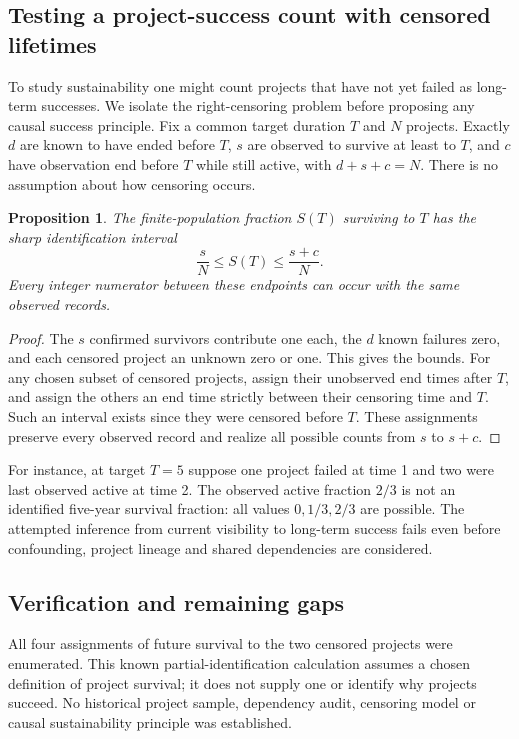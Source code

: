 \documentclass[11pt]{article}
\newtheorem{proposition}{Proposition}
\begin{document}
\subsection{Testing a project-success count with censored lifetimes}
To study sustainability one might count projects that have not yet failed as long-term successes. We isolate the right-censoring problem before proposing any causal success principle. Fix a common target duration $T$ and $N$ projects. Exactly $d$ are known to have ended before $T$, $s$ are observed to survive at least to $T$, and $c$ have observation end before $T$ while still active, with $d+s+c=N$. There is no assumption about how censoring occurs.
\begin{proposition}
The finite-population fraction $S(T)$ surviving to $T$ has the sharp identification interval
\[
\frac{s}{N}\le S(T)\le\frac{s+c}{N}.
\]
Every integer numerator between these endpoints can occur with the same observed records.
\end{proposition}
\begin{proof}
The $s$ confirmed survivors contribute one each, the $d$ known failures zero, and each censored project an unknown zero or one. This gives the bounds. For any chosen subset of censored projects, assign their unobserved end times after $T$, and assign the others an end time strictly between their censoring time and $T$. Such an interval exists since they were censored before $T$. These assignments preserve every observed record and realize all possible counts from $s$ to $s+c$.
\end{proof}
For instance, at target $T=5$ suppose one project failed at time 1 and two were last observed active at time 2. The observed active fraction $2/3$ is not an identified five-year survival fraction: all values $0,1/3,2/3$ are possible. The attempted inference from current visibility to long-term success fails even before confounding, project lineage and shared dependencies are considered.
\subsection{Verification and remaining gaps}
All four assignments of future survival to the two censored projects were enumerated. This known partial-identification calculation assumes a chosen definition of project survival; it does not supply one or identify why projects succeed. No historical project sample, dependency audit, censoring model or causal sustainability principle was established.
\end{document}
